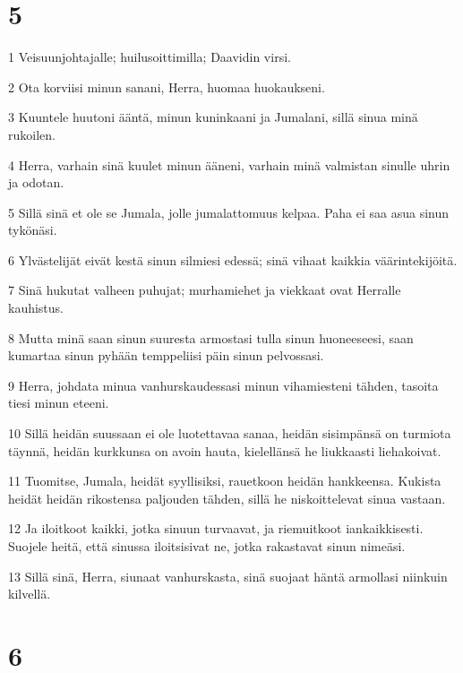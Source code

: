 \chapter{5}

\par 1 Veisuunjohtajalle; huilusoittimilla; Daavidin virsi.
\par 2 Ota korviisi minun sanani, Herra, huomaa huokaukseni.
\par 3 Kuuntele huutoni ääntä, minun kuninkaani ja Jumalani, sillä sinua minä rukoilen.
\par 4 Herra, varhain sinä kuulet minun ääneni, varhain minä valmistan sinulle uhrin ja odotan.
\par 5 Sillä sinä et ole se Jumala, jolle jumalattomuus kelpaa. Paha ei saa asua sinun tykönäsi.
\par 6 Ylvästelijät eivät kestä sinun silmiesi edessä; sinä vihaat kaikkia väärintekijöitä.
\par 7 Sinä hukutat valheen puhujat; murhamiehet ja viekkaat ovat Herralle kauhistus.
\par 8 Mutta minä saan sinun suuresta armostasi tulla sinun huoneeseesi, saan kumartaa sinun pyhään temppeliisi päin sinun pelvossasi.
\par 9 Herra, johdata minua vanhurskaudessasi minun vihamiesteni tähden, tasoita tiesi minun eteeni.
\par 10 Sillä heidän suussaan ei ole luotettavaa sanaa, heidän sisimpänsä on turmiota täynnä, heidän kurkkunsa on avoin hauta, kielellänsä he liukkaasti liehakoivat.
\par 11 Tuomitse, Jumala, heidät syyllisiksi, rauetkoon heidän hankkeensa. Kukista heidät heidän rikostensa paljouden tähden, sillä he niskoittelevat sinua vastaan.
\par 12 Ja iloitkoot kaikki, jotka sinuun turvaavat, ja riemuitkoot iankaikkisesti. Suojele heitä, että sinussa iloitsisivat ne, jotka rakastavat sinun nimeäsi.
\par 13 Sillä sinä, Herra, siunaat vanhurskasta, sinä suojaat häntä armollasi niinkuin kilvellä.

\chapter{6}

